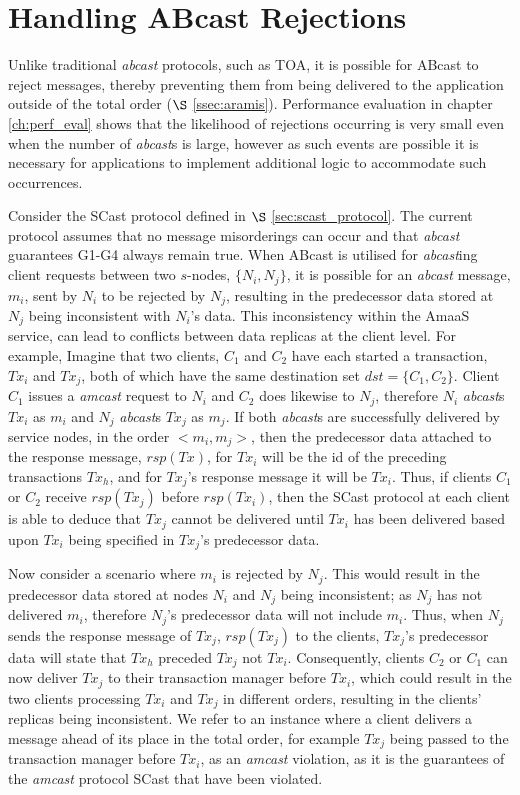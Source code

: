 \section{Handling ABcast Rejections}
 Unlike traditional \emph{abcast} protocols, such as TOA, it is possible for \textsf{ABcast} to reject messages, thereby preventing them from being delivered to the application outside of the total order ($\S$ \ref{ssec:aramis}).  Performance evaluation in chapter \ref{ch:perf_eval} shows that the likelihood of rejections occurring is very small even when the number of \emph{abcast}s is large, however as such events are possible it is necessary for applications to implement additional logic to accommodate such occurrences.  
 
Consider the \textsf{SCast} protocol defined in $\S$ \ref{sec:scast_protocol}.  The current protocol assumes that no message misorderings can occur and that \emph{abcast} guarantees G1-G4 always remain true.  When \textsf{ABcast} is utilised for \emph{abcast}ing client requests between two $s$-nodes, $\{N_i, N_j\}$, it is possible for an \emph{abcast} message, $m_i$, sent by $N_i$ to be rejected by $N_j$, resulting in the predecessor data stored at $N_j$ being inconsistent with $N_i$'s data.  This inconsistency within the \textsf{AmaaS} service, can lead to conflicts between data replicas at the client level.  For example, Imagine that two clients, $C_1$ and $C_2$ have each started a transaction, $Tx_i$ and $Tx_j$, both of which have the same destination set $dst=\{C_1, C_2\}$.  Client $C_1$ issues a \emph{amcast} request to $N_i$ and $C_2$ does likewise to $N_j$, therefore $N_i$ \emph{abcast}s $Tx_i$ as $m_i$ and $N_j$ \emph{abcast}s $Tx_j$ as $m_j$.  If both \emph{abcast}s are successfully delivered by service nodes, in the order $<m_i, m_j>$, then the predecessor data attached to the response message, $rsp(Tx)$, for $Tx_i$ will be the id of the preceding transactions $Tx_h$, and for $Tx_j$'s response message it will be $Tx_i$.  Thus, if clients $C_1$ or $C_2$ receive $rsp(Tx_j)$ before $rsp(Tx_i)$, then the \textsf{SCast} protocol at each client is able to deduce that $Tx_j$ cannot be delivered until $Tx_i$ has been delivered based upon $Tx_i$ being specified in $Tx_j$'s predecessor data.  

Now consider a scenario where $m_i$ is rejected by $N_j$.  This would result in the predecessor data stored at nodes $N_i$ and $N_j$ being inconsistent; as $N_j$ has not delivered $m_i$, therefore $N_j$'s predecessor data will not include $m_i$.  Thus, when $N_j$ sends the response message of $Tx_j$, $rsp(Tx_j)$ to the clients, $Tx_j$'s predecessor data will state that $Tx_h$ preceded $Tx_j$ not $Tx_i$. Consequently, clients $C_2$ or $C_1$ can now deliver $Tx_j$ to their transaction manager before $Tx_i$, which could result in the two clients processing $Tx_i$ and $Tx_j$ in different orders, resulting in the clients' replicas being inconsistent.  We refer to an instance where a client delivers a message ahead of its place in the total order, for example $Tx_j$ being passed to the transaction manager before $Tx_i$, as an \emph{amcast} violation, as it is the guarantees of the \emph{amcast} protocol \textsf{SCast} that have been violated.  

